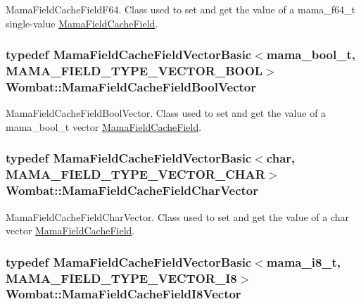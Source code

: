 MamaFieldCacheFieldF64. Class used to set and get the value of a mama\_\-f64\_\-t single-\/value {\ttfamily \hyperlink{classWombat_1_1MamaFieldCacheField}{MamaFieldCacheField}}. \hypertarget{namespaceWombat_ad450c3d0cc7be4e3a34507cdaaf9ee1f}{
\subsubsection[{MamaFieldCacheFieldBoolVector}]{\setlength{\rightskip}{0pt plus 5cm}typedef {\bf MamaFieldCacheFieldVectorBasic}$<$mama\_\-bool\_\-t, MAMA\_\-FIELD\_\-TYPE\_\-VECTOR\_\-BOOL$>$ {\bf Wombat::MamaFieldCacheFieldBoolVector}}}
\label{namespaceWombat_ad450c3d0cc7be4e3a34507cdaaf9ee1f}


MamaFieldCacheFieldBoolVector. Class used to set and get the value of a mama\_\-bool\_\-t vector {\ttfamily \hyperlink{classWombat_1_1MamaFieldCacheField}{MamaFieldCacheField}}. \hypertarget{namespaceWombat_a139860e29608224eb3f56272c16272e1}{
\subsubsection[{MamaFieldCacheFieldCharVector}]{\setlength{\rightskip}{0pt plus 5cm}typedef {\bf MamaFieldCacheFieldVectorBasic}$<$char, MAMA\_\-FIELD\_\-TYPE\_\-VECTOR\_\-CHAR$>$ {\bf Wombat::MamaFieldCacheFieldCharVector}}}
\label{namespaceWombat_a139860e29608224eb3f56272c16272e1}


MamaFieldCacheFieldCharVector. Class used to set and get the value of a char vector {\ttfamily \hyperlink{classWombat_1_1MamaFieldCacheField}{MamaFieldCacheField}}. \hypertarget{namespaceWombat_a90369796fdd134be8cd2bef4b6cc25aa}{
\subsubsection[{MamaFieldCacheFieldI8Vector}]{\setlength{\rightskip}{0pt plus 5cm}typedef {\bf MamaFieldCacheFieldVectorBasic}$<$mama\_\-i8\_\-t, MAMA\_\-FIELD\_\-TYPE\_\-VECTOR\_\-I8$>$ {\bf Wombat::MamaFieldCacheFieldI8Vector}}}
\label{namespaceWombat_a90369796fdd134be8cd2bef4b6cc25aa}


